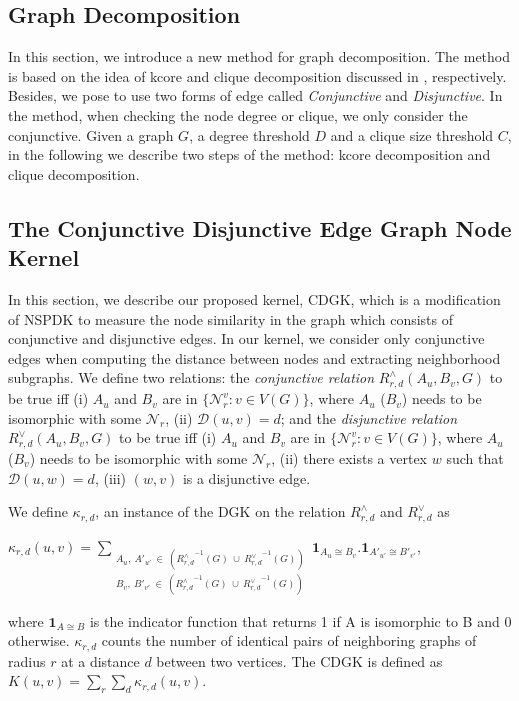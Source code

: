 \documentclass{esannV2}
\begin{document}
\subsection{Graph Decomposition}
In this section, we introduce a new method for graph decomposition. The method is based on the idea of kcore and clique decomposition discussed in \cite{kcore}, \cite{clique} respectively. Besides, we pose to use two forms of edge called \textit{Conjunctive} and \textit{Disjunctive}. In the method, when checking the node degree or clique, we only consider the conjunctive. Given a graph $G$, a degree threshold $D$ and a clique size threshold $C$, in the following we describe two steps of the method: kcore decomposition and clique decomposition.

\subsection{The Conjunctive Disjunctive Edge Graph Node Kernel}
In this section, we describe our proposed kernel, CDGK, which is a modification of NSPDK to measure the node similarity in the graph which consists of conjunctive and disjunctive edges. In our kernel, we consider only conjunctive edges when computing the distance between nodes and extracting neighborhood subgraphs. We define two relations: the \textit{conjunctive relation} $R^{\wedge}_{r,d}(A_u, B_v, G)$ to be true iff (i) $A_u$ and $B_v$ are in $\lbrace \mathcal{N}_r^v: v \in V(G) \rbrace$, where $A_u$ ($B_v$) needs to be isomorphic with some $\mathcal{N}_r$, (ii) $\mathcal{D}(u,v)= d$; and the \textit{disjunctive relation} $R_{r,d}^{\vee}(A_u, B_v, G)$ to be true iff (i) $A_u$ and $B_v$ are in $\lbrace \mathcal{N}_r^v: v \in V(G) \rbrace$, where $A_u$ ($B_v$) needs to be isomorphic with some $\mathcal{N}_r$,  (ii) there exists a vertex $w$ such that $\mathcal{D}(u,w)= d$, (iii) $(w,v)$ is a disjunctive edge.

We define $\kappa_{r,d}$, an instance of the DGK on the relation $R^{\wedge}_{r,d}$ and $R^{\vee}_{r,d}$ as
\begin{center}
 $\kappa_{r,d}(u,v) = \sum\limits_{\substack
 {A_u,\ {A'}_{u'} \ \in \ ({R_{r,d}^{\wedge}}^{ -1}(G)\ \cup\  {R_{r,d}^{\vee}}^{ -1}(G)) \\
  B_v,\ {B'}_{v'} \ \in \ ({R_{r,d}^{\wedge}}^{ -1}(G)\ \cup\  {R_{r,d}^{\vee}}^{ -1}(G)) }}
  { \textbf{1}_{A_u \cong B_v}.{ \textbf{1}_{A'_{u'} \cong B'_{v'}}}}$,
\end{center}
where $\textbf{1}_{A \cong B}$ is the indicator function that returns 1 if A is isomorphic to B and 0 otherwise.
$\kappa_{r,d}$ counts the number of identical pairs of neighboring graphs of radius $r$ at a distance $d$ between two vertices. The CDGK is defined as $K(u,v) = \sum\limits_{r}{\sum\limits_{d}{\kappa_{r,d}(u,v)}}$.
\end{document}
